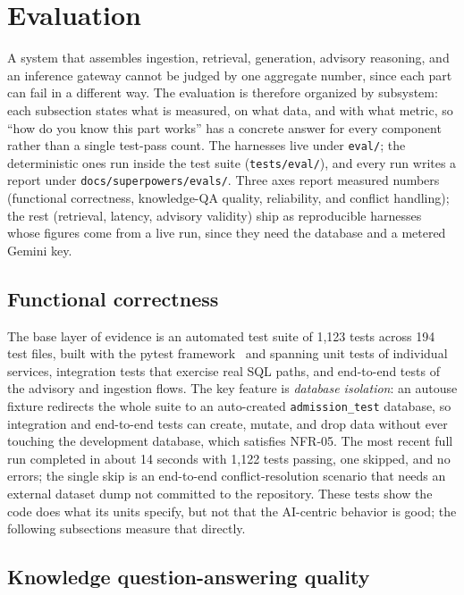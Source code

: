 \documentclass[../main.tex]{subfiles}
\begin{document}
\section{Evaluation}
\label{section:4.4}

A system that assembles ingestion, retrieval, generation, advisory reasoning, and an inference gateway cannot be judged by one aggregate number, since each part can fail in a different way.
The evaluation is therefore organized by subsystem: each subsection states what is measured, on what data, and with what metric, so ``how do you know this part works'' has a concrete answer for every component rather than a single test-pass count.
The harnesses live under \texttt{eval/}; the deterministic ones run inside the test suite (\texttt{tests/eval/}), and every run writes a report under \texttt{docs/superpowers/evals/}.
Three axes report measured numbers (functional correctness, knowledge-QA quality, reliability, and conflict handling); the rest (retrieval, latency, advisory validity) ship as reproducible harnesses whose figures come from a live run, since they need the database and a metered Gemini key.

\subsection{Functional correctness}
\label{subsection:4.4.1}

The base layer of evidence is an automated test suite of 1{,}123 tests across 194 test files, built with the pytest framework~\cite{pytest} and spanning unit tests of individual services, integration tests that exercise real \gls{SQL} paths, and end-to-end tests of the advisory and ingestion flows.
The key feature is \textit{database isolation}: an autouse fixture redirects the whole suite to an auto-created \texttt{admission\_test} database, so integration and end-to-end tests can create, mutate, and drop data without ever touching the development database, which satisfies NFR-05.
The most recent full run completed in about 14 seconds with 1{,}122 tests passing, one skipped, and no errors; the single skip is an end-to-end conflict-resolution scenario that needs an external dataset dump not committed to the repository.
These tests show the code does what its units specify, but not that the AI-centric behavior is good; the following subsections measure that directly.

\subsection{Knowledge question-answering quality}
\label{subsection:4.4.2}
\end{document}

